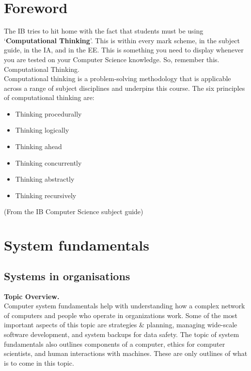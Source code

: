 \documentclass[12pt,a4paper]{article}
\begin{document}
\section*{Foreword}
The IB tries to hit home with the fact that students must be using ‘\textbf{Computational Thinking}’. This is within every mark scheme, in the subject guide, in the IA, and in the EE. This is something you need to display whenever you are tested on your Computer Science knowledge. So, remember this.\\
{\color{red} Computational Thinking.} \\
Computational thinking is a problem-solving methodology that is applicable across a range of subject disciplines and underpins this course. The six principles of computational thinking are: 
\begin{itemize}
\item Thinking procedurally 
\item Thinking logically 
\item Thinking ahead
\item Thinking concurrently 
\item Thinking abstractly
\item Thinking recursively
\end{itemize}
(From the IB Computer Science subject guide)

\clearpage


\section{System fundamentals}

\subsection{Systems in organisations}

{\color{red}\textbf{Topic Overview.}}\\
Computer system fundamentals help with understanding how a complex network of computers and people who operate in organizations work. Some of the most important aspects of this topic are strategies \& planning, managing wide-scale software development, and system backups for data safety. The topic of system fundamentals also outlines components of a computer, ethics for computer scientists, and human interactions with machines. These are only outlines of what is to come in this topic.\\
\end{document}
